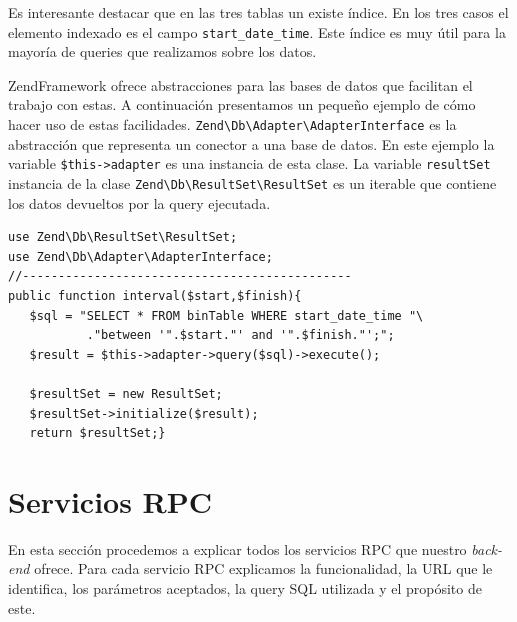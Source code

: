 	\par 
	Es interesante destacar que en las tres tablas un existe índice. En los tres casos el elemento indexado es el campo
	\texttt{start\_date\_time}. Este índice es muy útil para la mayoría de queries que realizamos sobre los datos.
	\par
	ZendFramework ofrece abstracciones para las bases de datos que facilitan el trabajo con estas. A continuación presentamos un pequeño ejemplo
	de cómo hacer uso de estas facilidades. \texttt{Zend\textbackslash Db\textbackslash Adapter\textbackslash AdapterInterface} es la abstracción
	que representa un conector a una base de datos. En este ejemplo la variable \texttt{\$this->adapter} es una instancia de esta clase. La
	variable \texttt{resultSet} instancia de la clase \texttt{Zend\textbackslash Db\textbackslash ResultSet\textbackslash ResultSet} es un
	iterable que contiene los datos devueltos por la query ejecutada.
	\begin{lstlisting}[style=myPhp]
use Zend\Db\ResultSet\ResultSet;
use Zend\Db\Adapter\AdapterInterface;
//----------------------------------------------
public function interval($start,$finish){
   $sql = "SELECT * FROM binTable WHERE start_date_time "\
           ."between '".$start."' and '".$finish."';";
   $result = $this->adapter->query($sql)->execute();

   $resultSet = new ResultSet;
   $resultSet->initialize($result);
   return $resultSet;}
	\end{lstlisting}
\section{Servicios RPC}
	En esta sección procedemos a explicar todos los servicios RPC que nuestro \emph{back-end} ofrece. Para cada servicio RPC explicamos la
	funcionalidad, la URL que le identifica, los parámetros aceptados, la query SQL utilizada y el propósito de este.

